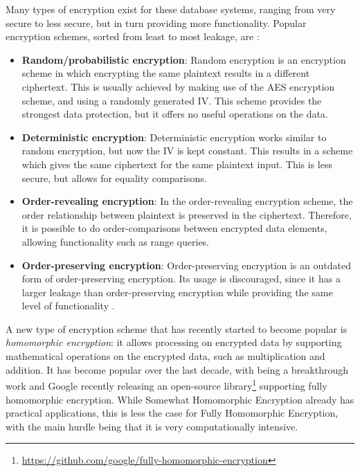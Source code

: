 Many types of encryption exist for these database systems, ranging from very secure to less secure, but in turn providing more functionality. Popular encryption schemes, sorted from least to most leakage, are \citep{cryptdice}:
\begin{itemize}
    \item \textbf{Random/probabilistic encryption}: Random encryption is an encryption scheme in which encrypting the same plaintext results in a different ciphertext. This is usually achieved by making use of the AES encryption scheme, and using a randomly generated \gls{IV}. This scheme provides the strongest data protection, but it offers no useful operations on the data.
    \item \textbf{Deterministic encryption}: Deterministic encryption works similar to random encryption, but now the \gls{IV} is kept constant. This results in a scheme which gives the same ciphertext for the same plaintext input. This is less secure, but allows for equality comparisons.
    \item \textbf{Order-revealing encryption}: In the order-revealing encryption scheme, the order relationship between plaintext is preserved in the ciphertext. Therefore, it is possible to do order-comparisons between encrypted data elements, allowing functionality such as range queries.
    \item \textbf{Order-preserving encryption}: Order-preserving encryption is an outdated form of order-preserving encryption. Its usage is discouraged, since it has a larger leakage than order-preserving encryption while providing the same level of functionality \citep{stanford-ore}.
\end{itemize}
A new type of encryption scheme that has recently started to become popular is \textit{homomorphic encryption}: it allows processing on encrypted data by supporting mathematical operations on the encrypted data, such as multiplication and addition. It has become popular over the last decade, with \citet{fhe} being a breakthrough work and Google recently releasing an open-source library\footnote{\url{https://github.com/google/fully-homomorphic-encryption}} supporting fully homomorphic encryption. While Somewhat Homomorphic Encryption already has practical applications, this is less the case for Fully Homomorphic Encryption, with the main hurdle being that it is very computationally intensive.
